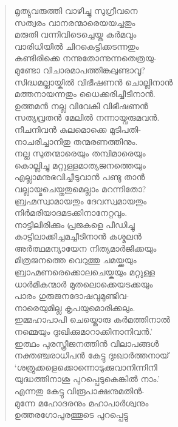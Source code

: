\begin{verse}
മൃത്യുവരുത്തി വാഴിച്ചു സുഗ്രീവനെ\\
സത്വരം വാനരന്മാരെയയച്ചതും\\
മരുതി വന്നിവിടെച്ചെയ്ത കര്‍മവും\\
വാരിധിയില്‍ ചിറകെട്ടിക്കടന്നതും\\
കണ്ടിരിക്കെ നന്നുതോന്നുന്നതെത്രയു-\\
മുണ്ടോ വിചാരമാപത്തിങ്കലുണ്ടാവൂ?\\
സിദ്ധമല്ലായ്കില്‍ വിഭീഷണന്‍ ചൊല്ലിനാന്‍\\
മത്തനായന്നതും ധൈക്കരിച്ചീടിനാന്‍.\\
ഉത്തമന്‍ നല്ല വിവേകി വിഭീഷണന്‍\\
സത്യവ്രതന്‍ മേലില്‍ നന്നായ്വരുമവന്‍.\\
നീചനിവന്‍ കുലമൊക്കെ മുടിപതി-\\
നാചരിച്ചാനിതു തന്മരണത്തിനും.\\
നല്ല സുതന്മാരെയും തമ്പിമാരെയും\\
കൊല്ലിച്ചു മറ്റുള്ളമാത്യജനത്തെയും\\
എല്ലാമനുഭവിച്ചീടുവാന്‍ പണ്ടു താന്‍\\
വല്ലായ്മചെയ്തതുമെല്ലാം മറന്നിതോ?\\
ബ്രഹ്മസ്വാമായതും ദേവസ്വമായതും\\
നിര്‍മരിയാദമടക്കിനാനേറ്റവും.\\
നാട്ടിലിരിക്കും പ്രജകളെ പീഡിച്ചു\\
കാട്ടിലാക്കിച്ചമച്ചീടിനാന്‍ കശ്മലന്‍\\
അര്‍ത്ഥമന്യായേന നിത്യമാര്‍ജിക്കയും\\
മിത്രജനത്തെ വെറുത്തു ചമയ്ക്കയും\\
ബ്രാഹ്മണരെക്കൊലചെയ്കയും മറ്റുള്ള\\
ധാര്‍മികന്മാര്‍ മുതലൊക്കെയടക്കയും\\
പാരം ഗുരുജനദോഷവുമുണ്ടിവ-\\
നാരെയുമില്ല കൃപയുമൊരിക്കലും.\\
ഇമ്മഹാപാപി ചെയ്തൊരു കര്‍മത്തിനാല്‍\\
നമ്മെയും ദുഃഖിക്കുമാറാക്കിനാനിവന്‍.’\\
ഇത്ഥം പുരസ്ത്രീജനത്തിന്‍ വിലാപങ്ങള്‍\\
നക്തഞ്ചരാധിപന്‍ കേട്ടു ദുഃഖാര്‍ത്തനായ്\\
‘ശത്രുക്കളെക്കൊന്നൊടുക്കുവാനിന്നിനി\\
യുദ്ധത്തിനാശു പുറപ്പെടുകെങ്കില്‍ നാം.’\\
എന്നതു കേട്ടു വിരൂപാക്ഷനുമതിന്‍-\\
മുന്നേ മഹോദരനും മഹാപാര്‍ശ്വനും\\
ഉത്തരഗോപുരത്തൂടെ പുറപ്പെട്ടു\\

\end{verse}
